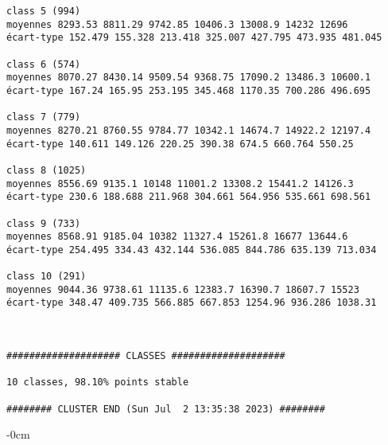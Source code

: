 \documentclass[sustainability,article,submit,pdftex,moreauthors]{Definitions/mdpi}
\begin{document}
\begin{footnotesize}
\begin{verbatim}
class 5 (994)
moyennes 8293.53 8811.29 9742.85 10406.3 13008.9 14232 12696
écart-type 152.479 155.328 213.418 325.007 427.795 473.935 481.045

class 6 (574)
moyennes 8070.27 8430.14 9509.54 9368.75 17090.2 13486.3 10600.1
écart-type 167.24 165.95 253.195 345.468 1170.35 700.286 496.695

class 7 (779)
moyennes 8270.21 8760.55 9784.77 10342.1 14674.7 14922.2 12197.4
écart-type 140.611 149.126 220.25 390.38 674.5 660.764 550.25

class 8 (1025)
moyennes 8556.69 9135.1 10148 11001.2 13308.2 15441.2 14126.3
écart-type 230.6 188.688 211.968 304.661 564.956 535.661 698.561

class 9 (733)
moyennes 8568.91 9185.04 10382 11327.4 15261.8 16677 13644.6
écart-type 254.495 334.43 432.144 536.085 844.786 635.139 713.034

class 10 (291)
moyennes 9044.36 9738.61 11135.6 12383.7 16390.7 18607.7 15523
écart-type 348.47 409.735 566.885 667.853 1254.96 936.286 1038.31



#################### CLASSES ####################

10 classes, 98.10% points stable

######## CLUSTER END (Sun Jul  2 13:35:38 2023) ########

\end{verbatim}
\end{footnotesize}

\begin{adjustwidth}{-\extralength}{0cm}




\end{adjustwidth}
\end{document}
